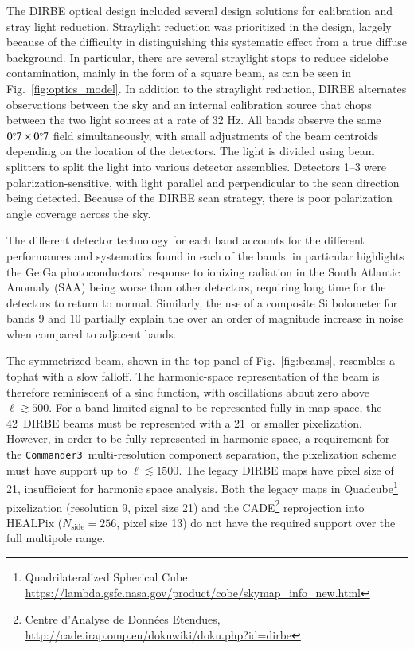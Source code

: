 \documentclass{aa}
\def\commanderthree{\texttt{Commander3}}
\def\COBE{\textit{COBE}}
\begin{document}
The DIRBE optical design included several design solutions for calibration and stray light reduction. Straylight reduction was prioritized in the design, largely because of the difficulty in distinguishing this systematic effect from a true diffuse background. In particular, there are several straylight stops to reduce sidelobe contamination, mainly in the form of a square beam, as can be seen in Fig.~\ref{fig:optics_model}. In addition to the straylight reduction, DIRBE alternates observations between the sky and an internal calibration source that chops between the two light sources at a rate of 32 Hz.
All bands observe the same $0\overset{\circ}{.}7\times0\overset{\circ}{.}7$  field simultaneously, with small adjustments of the beam centroids depending on the location of the detectors. The light is divided using beam splitters to split the light into various detector assemblies. Detectors 1--3 were polarization-sensitive, with light parallel and perpendicular to the scan direction being detected. Because of the DIRBE scan strategy, there is poor polarization angle coverage across the sky.



The different detector technology for each band accounts for the different performances and systematics found in each of the bands. \citet{silverberg93} in particular highlights the Ge:Ga photoconductors' response to ionizing radiation in the South Atlantic Anomaly (SAA) being worse than other detectors, requiring long time for the detectors to return to normal. Similarly, the use of a composite Si bolometer for bands 9 and 10 partially explain the over an order of magnitude increase in noise when compared to adjacent bands.

The symmetrized beam, shown in the top panel of Fig.~\ref{fig:beams}, resembles a tophat with a slow falloff. The harmonic-space representation of the beam is therefore reminiscent of a sinc function, with oscillations about zero above $\ell\gtrsim500$. For a band-limited signal to be represented fully in map space, the 42\arcm\ DIRBE beams must be represented with a 21\arcm\ or smaller pixelization. However, in order to be fully represented in harmonic space, a requirement for the \commanderthree\ multi-resolution component separation, the pixelization scheme must have support up to $\ell\lesssim1500$. The legacy DIRBE maps have pixel size of 21\arcm, insufficient for harmonic space analysis.
Both the legacy maps in Quadcube\footnote{
	Quadrilateralized Spherical Cube \url{https://lambda.gsfc.nasa.gov/product/cobe/skymap\_info\_new.html}
}
pixelization (resolution 9, pixel size 21\arcm) and the CADE\footnote{Centre d'Analyse de Données Etendues, \url{http://cade.irap.omp.eu/dokuwiki/doku.php?id=dirbe}} reprojection into HEALPix ($N_\mathrm{side}=256$, pixel size 13) do not have the required support over the full multipole range. 
\end{document}
